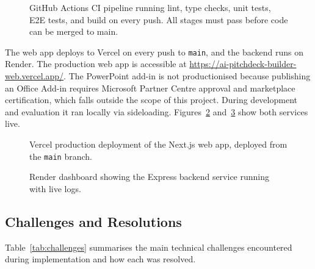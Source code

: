 \begin{figure}[H]
\centering
{}
\caption{GitHub Actions CI pipeline running lint, type checks, unit tests, E2E tests, and build on every push. All stages must pass before code can be merged to main.}
\label{fig:github-actions}
\end{figure}

The web app deploys to Vercel on every push to \texttt{main}, and the backend runs on Render. The production web app is accessible at \url{https://ai-pitchdeck-builder-web.vercel.app/}. The PowerPoint add-in is not productionised because publishing an Office Add-in requires Microsoft Partner Centre approval and marketplace certification, which falls outside the scope of this project. During development and evaluation it ran locally via sideloading. Figures~\ref{fig:vercel-deploy} and~\ref{fig:render-deploy} show both services live.

\begin{figure}[H]
\centering
{}
\caption{Vercel production deployment of the Next.js web app, deployed from the \texttt{main} branch.}
\label{fig:vercel-deploy}
\end{figure}

\begin{figure}[H]
\centering
{}
\caption{Render dashboard showing the Express backend service running with live logs.}
\label{fig:render-deploy}
\end{figure}

\subsection{Challenges and Resolutions}

Table~\ref{tab:challenges} summarises the main technical challenges encountered during implementation and how each was resolved.

